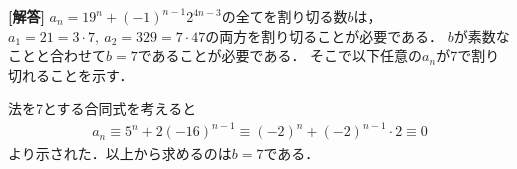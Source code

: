 \documentclass[../../main.tex]{subfiles}
\begin{document}
\begin{oframed}
  
\end{oframed}

{\bf [解答]}
$a_n=19^n+(-1)^{n-1}2^{4n-3}$の全てを割り切る数$b$は，$a_1=21=3\cdot 7,\ a_2=329=7 \cdot 47$の両方を割り切ることが必要である．
$b$が素数なことと合わせて$b=7$であることが必要である．
そこで以下任意の$a_n$が7で割り切れることを示す．

法を7とする合同式を考えると
\begin{align}
  a_n\equiv5^n+2(-16)^{n-1}\equiv(-2)^n+(-2)^{n-1}\cdot2\equiv0
\end{align}
より示された．以上から求めるのは$b=7$である．

\newpage
\end{document}
